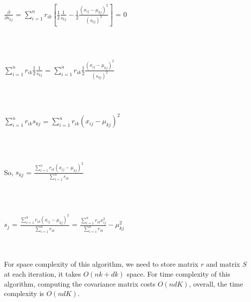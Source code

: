 \documentclass[11pt]{article} %
\begin{document}
\centerline{$\frac{\partial}{\partial s_{kj}}$ = $\sum_{i=1}^{n}r_{ik}[\frac{1}{2}\frac{1}{s_{kj}}-\frac{1}{2}\frac{(x_{ij}-\mu_{kj})^{2}}{(s_{kj})^2}]$ = $0$}\\\\ 
\centerline{$\sum_{i=1}^{n}r_{ik}\frac{1}{2}\frac{1}{s_{kj}}$ = $\sum_{i=1}^{n}r_{ik}\frac{1}{2}\frac{(x_{ij}-\mu_{kj})^{2}}{(s_{kj})^2}$}\\\\
\centerline{$\sum_{i=1}^{n}r_{ik}s_{kj}$ = $\sum_{i=1}^{n}r_{ik}(x_{ij}-\mu_{kj})^{2}$}\\\\
\centerline{So, $s_{kj}$ = $\frac{\sum_{i=1}^{n}r_{ik}(x_{ij}-\mu_{kj})^{2}}{\sum_{i=1}^{n}r_{ik}}$}\\\\
\centerline{$s_{j}$ = $\frac{\sum_{i=1}^{n}r_{ik}(x_{ij}-\mu_{kj})^{2}}{\sum_{i=1}^{n}r_{ik}}$ = $\frac{\sum_{i=1}^{n}r_{ik}x_{ij}^2}{\sum_{i=1}^{n}r_{ik}}-\mu_{kj}^{2}$}\\\\
For space complexity of this algorithm, we need to store matrix $r$ and matrix $S$ at each iteration, it takes $O(nk+dk)$ space. For time complexity of this algorithm, computing the covariance matrix costs $O(ndK)$, overall, the time complexity is $O(ndK)$.
\end{document}
